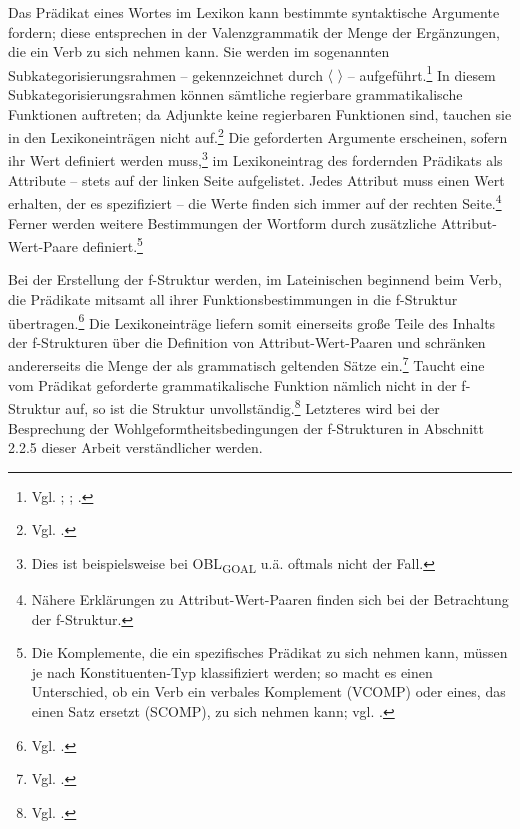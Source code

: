 \documentclass[12pt,a4paper]{article}
\begin{document}
Das Prädikat eines Wortes im Lexikon kann bestimmte syntaktische Argumente fordern; diese entsprechen in der Valenzgrammatik der Menge der Ergänzungen, die ein Verb zu sich nehmen kann. Sie werden im sogenannten Subkategorisierungsrahmen -- gekennzeichnet durch $\langle$ $\rangle$ -- aufgeführt.\footnote{Vgl. \cite[7]{Dal}; \cite[70]{Skript}; \cite[27]{Rohrer}.} In diesem Subkategorisierungsrahmen können sämtliche regierbare grammatikalische Funktionen auftreten; da Adjunkte keine regierbaren Funktionen sind, tauchen sie in den Lexikoneinträgen nicht auf.\footnote{Vgl. \cite[27]{Rohrer}.} Die geforderten Argumente erscheinen, sofern ihr Wert definiert werden muss,\footnote{Dies ist beispielsweise bei OBL\textsubscript{GOAL} u.ä. oftmals nicht der Fall.} im Lexikoneintrag des fordernden Prädikats als Attribute -- stets auf der linken Seite aufgelistet. Jedes Attribut muss einen Wert erhalten, der es spezifiziert -- die Werte finden sich immer auf der rechten Seite.\footnote{Nähere Erklärungen zu Attribut-Wert-Paaren finden sich bei der Betrachtung der f-Struktur.} Ferner werden weitere Bestimmungen der Wortform durch zusätzliche Attribut-Wert-Paare definiert.\footnote{Die Komplemente, die ein spezifisches Prädikat zu sich nehmen kann, müssen je nach Konstituenten-Typ klassifiziert werden; so macht es einen Unterschied, ob ein Verb ein verbales Komplement (VCOMP) oder eines, das einen Satz ersetzt (SCOMP), zu sich nehmen kann; vgl. \cite[22]{Rohrer}.}

Bei der Erstellung der f-Struktur werden, im Lateinischen beginnend beim Verb, die Prädikate mitsamt all ihrer Funktionsbestimmungen in die f-Struktur übertragen.\footnote{Vgl. \cite[28]{Rohrer}.} Die Lexikoneinträge liefern somit einerseits große Teile des Inhalts der f-Strukturen über die Definition von Attribut-Wert-Paaren und schränken andererseits die Menge der als grammatisch geltenden Sätze ein.\footnote{Vgl. \cite[63]{Skript}.}  Taucht eine vom Prädikat geforderte grammatikalische Funktion nämlich nicht in der f-Struktur auf, so ist die Struktur unvollständig.\footnote{Vgl. \cite[28]{Rohrer}.} Letzteres wird bei der Besprechung der Wohlgeformtheitsbedingungen der f-Strukturen in Abschnitt 2.2.5 dieser Arbeit verständlicher werden.
\end{document}
